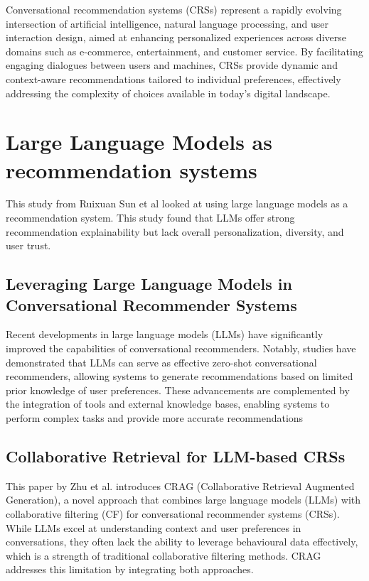 


Conversational recommendation systems (CRSs) represent a rapidly evolving intersection of artificial intelligence, natural language processing, and user interaction
design, aimed at enhancing personalized experiences across diverse domains such as e-commerce, entertainment, and customer service. 
By facilitating engaging dialogues between users and machines, CRSs provide dynamic and context-aware
recommendations tailored to individual preferences, effectively addressing the complexity of choices available in today's digital landscape.


\section{Large Language Models as recommendation systems}
\label{sec:llm_as_recommendation_system}
This study from Ruixuan Sun et al \cite{sun2024largelanguagemodelsconversational} looked at using large language models as a recommendation system.
This study found that LLMs offer strong recommendation explainability but lack overall personalization, diversity, and user trust. 


\subsection{Leveraging Large Language Models in Conversational Recommender Systems}
Recent developments\cite{bdcc8040036} in large language models (LLMs) have significantly improved
the capabilities of conversational recommenders. 
Notably, studies have demonstrated that LLMs can serve as effective zero-shot conversational recommenders,
allowing systems to generate recommendations based on limited prior knowledge of
user preferences. These advancements are complemented by the integration
of tools and external knowledge bases, enabling systems to perform complex tasks
and provide more accurate recommendations

\subsection{Collaborative Retrieval for LLM-based CRSs}
\label{sec:collaborative_retrieval}
This paper by Zhu et al. \cite{zhu2025collaborativeretrievallargelanguage} introduces CRAG (Collaborative Retrieval Augmented Generation), a novel approach that combines large language models (LLMs) with collaborative filtering (CF) for conversational recommender systems (CRSs). While LLMs excel at understanding context and user preferences in conversations, they often lack the ability to leverage behavioural data effectively, which is a strength of traditional collaborative filtering methods. CRAG addresses this limitation by integrating both approaches.

